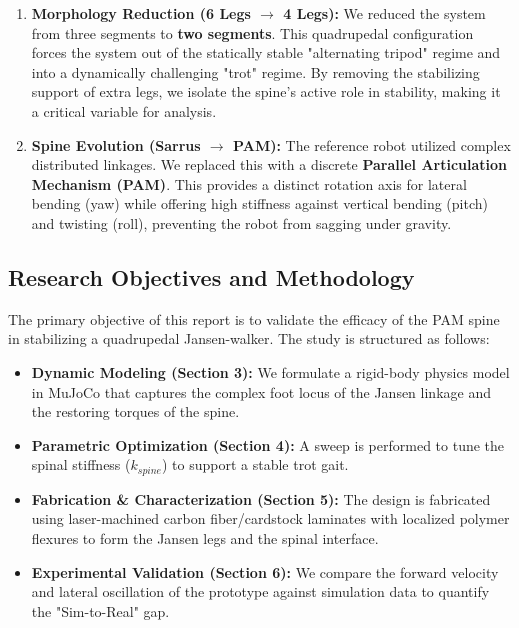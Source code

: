 \documentclass[11pt, a4paper]{article}
\begin{document}
\begin{enumerate}
    \item \textbf{Morphology Reduction (6 Legs $\rightarrow$ 4 Legs):} We reduced the system from three segments to \textbf{two segments}. This quadrupedal configuration forces the system out of the statically stable "alternating tripod" regime and into a dynamically challenging "trot" regime. By removing the stabilizing support of extra legs, we isolate the spine's active role in stability, making it a critical variable for analysis.
    \item \textbf{Spine Evolution (Sarrus $\rightarrow$ PAM):} The reference robot utilized complex distributed linkages. We replaced this with a discrete \textbf{Parallel Articulation Mechanism (PAM)}. This provides a distinct rotation axis for lateral bending (yaw) while offering high stiffness against vertical bending (pitch) and twisting (roll), preventing the robot from sagging under gravity.
\end{enumerate}

\subsection{Research Objectives and Methodology}
The primary objective of this report is to validate the efficacy of the PAM spine in stabilizing a quadrupedal Jansen-walker. The study is structured as follows:
\begin{itemize}
    \item \textbf{Dynamic Modeling (Section 3):} We formulate a rigid-body physics model in MuJoCo that captures the complex foot locus of the Jansen linkage and the restoring torques of the spine.
    \item \textbf{Parametric Optimization (Section 4):} A sweep is performed to tune the spinal stiffness ($k_{spine}$) to support a stable trot gait.
    \item \textbf{Fabrication \& Characterization (Section 5):} The design is fabricated using laser-machined carbon fiber/cardstock laminates with localized polymer flexures to form the Jansen legs and the spinal interface.
    \item \textbf{Experimental Validation (Section 6):} We compare the forward velocity and lateral oscillation of the prototype against simulation data to quantify the "Sim-to-Real" gap.
\end{itemize}

\end{document}
